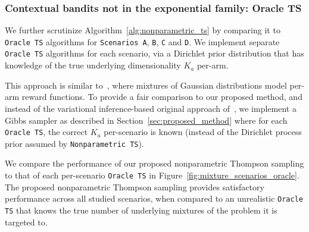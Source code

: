 \subsubsection{Contextual bandits not in the exponential family: Oracle TS}
\label{sssec:evaluation_mixture_scenarios_oracle}

We further scrutinize Algorithm~\ref{alg:nonparametric_ts} by comparing it to \texttt{Oracle TS} algorithms for \texttt{Scenarios A}, \texttt{B}, \texttt{C} and \texttt{D}.
We implement separate \texttt{Oracle TS} algorithms for each scenario, via a Dirichlet prior distribution that has knowledge of the true underlying dimensionality $K_a$ per-arm.

This approach is similar to~\cite{ip-Urteaga2018}, where mixtures of Gaussian distributions model per-arm reward functions.
To provide a fair comparison to our proposed method, and instead of the variational inference-based original approach of~\citet{ip-Urteaga2018}, we implement a Gibbs sampler as described in Section~\ref{sec:proposed_method} where for each \texttt{Oracle TS}, the correct $K_a$ per-scenario is known (instead of the Dirichlet process prior assumed by \texttt{Nonparametric TS}).

We compare the performance of our proposed nonparametric Thompson sampling to that of each per-scenario \texttt{Oracle TS} in Figure~\ref{fig:mixture_scenarios_oracle}.
The proposed nonparametric Thompson sampling provides satisfactory performance across all studied scenarios, when compared to an unrealistic \texttt{Oracle TS} that knows the true number of underlying mixtures of the problem it is targeted to.


